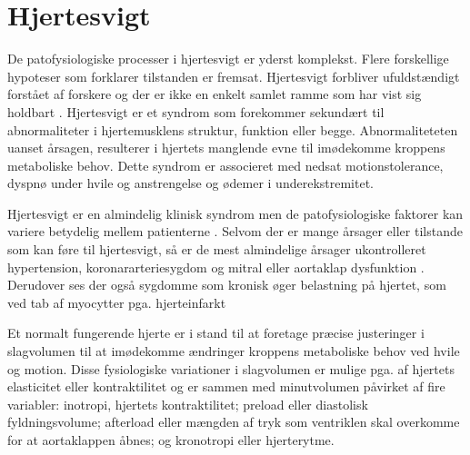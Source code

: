 \section{Hjertesvigt}

De patofysiologiske processer i hjertesvigt er yderst komplekst. Flere forskellige hypoteser som forklarer tilstanden er fremsat. \citep{Abraham2007}
Hjertesvigt forbliver ufuldstændigt forstået af forskere og der er ikke en enkelt samlet ramme som har vist sig holdbart  \citep{Coronel2001}. 
Hjertesvigt er et syndrom som forekommer sekundært til abnormaliteter i hjertemusklens struktur, funktion eller begge. Abnormaliteteten uanset årsagen, resulterer i hjertets manglende evne til imødekomme kroppens metaboliske behov. \citep{Shah2011}\citep{Fletcher2001}\citep{Francis1998}\citep{Mudd2008} Dette syndrom er associeret med nedsat motionstolerance, dyspnø under hvile og anstrengelse og ødemer i underekstremitet. \citep{Francis1998}

Hjertesvigt er en almindelig klinisk syndrom men de patofysiologiske faktorer kan variere betydelig mellem patienterne \citep{Parmley1985}. Selvom der er mange årsager eller tilstande som kan føre til hjertesvigt, så er de mest almindelige årsager ukontrolleret hypertension, koronararteriesygdom og mitral eller aortaklap dysfunktion \citep{Fletcher2001}. Derudover ses der også sygdomme som kronisk øger belastning på hjertet, som ved tab af myocytter pga. hjerteinfarkt \citep{Shah2011} 

Et normalt fungerende hjerte er i stand til at foretage præcise justeringer i slagvolumen til at imødekomme ændringer kroppens metaboliske behov ved hvile og motion. Disse fysiologiske variationer i slagvolumen er mulige pga. af hjertets elasticitet eller kontraktilitet og er sammen med minutvolumen påvirket af fire variabler: inotropi, hjertets kontraktilitet; preload eller diastolisk fyldningsvolume; afterload eller mængden af tryk som ventriklen skal overkomme for at aortaklappen åbnes; og kronotropi eller hjerterytme. \citep{Fletcher2001}  

